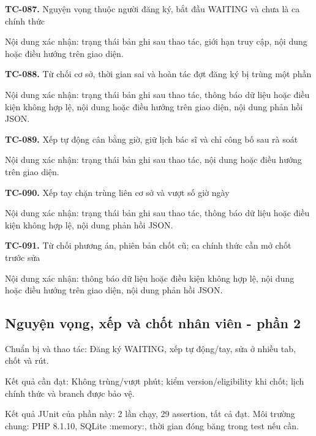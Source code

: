 \noindent\textbf{TC-087.} Nguyện vọng thuộc người đăng ký, bắt đầu WAITING và chưa là ca chính thức\par
Nội dung xác nhận:\allowbreak{} trạng thái bản ghi sau thao tác, giới hạn truy cập, nội dung hoặc điều hướng trên giao diện.\allowbreak{}

\noindent\textbf{TC-088.} Từ chối cơ sở, thời gian sai và hoàn tác đợt đăng ký bị trùng một phần\par
Nội dung xác nhận:\allowbreak{} trạng thái bản ghi sau thao tác, thông báo dữ liệu hoặc điều kiện không hợp lệ, nội dung hoặc điều hướng trên giao diện, nội dung phản hồi JSON.\allowbreak{}

\noindent\textbf{TC-089.} Xếp tự động cân bằng giờ, giữ lịch bác sĩ và chỉ công bố sau rà soát\par
Nội dung xác nhận:\allowbreak{} trạng thái bản ghi sau thao tác, nội dung hoặc điều hướng trên giao diện.\allowbreak{}

\noindent\textbf{TC-090.} Xếp tay chặn trùng liên cơ sở và vượt số giờ ngày\par
Nội dung xác nhận:\allowbreak{} trạng thái bản ghi sau thao tác, thông báo dữ liệu hoặc điều kiện không hợp lệ, nội dung phản hồi JSON.\allowbreak{}

\noindent\textbf{TC-091.} Từ chối phương án, phiên bản chốt cũ; ca chính thức cần mở chốt trước sửa\par
Nội dung xác nhận:\allowbreak{} thông báo dữ liệu hoặc điều kiện không hợp lệ, nội dung hoặc điều hướng trên giao diện, nội dung phản hồi JSON.\allowbreak{}


\par\vspace{8pt}

\subsection{Nguyện vọng, xếp và chốt nhân viên - phần 2}
Chuẩn bị và thao tác:\allowbreak{} Đăng ký WAITING, xếp tự động/\allowbreak{}tay, sửa ở nhiều tab, chốt và rút.\allowbreak{}

Kết quả cần đạt:\allowbreak{} Không trùng/\allowbreak{}vượt phút; kiểm version/\allowbreak{}eligibility khi chốt; lịch chính thức và branch được bảo vệ.\allowbreak{}

Kết quả JUnit của phần này:\allowbreak{} 2 lần chạy, 29 assertion, tất cả đạt.\allowbreak{} Môi trường chung:\allowbreak{} PHP 8.\allowbreak{}1.\allowbreak{}10, SQLite :\allowbreak{}memory:\allowbreak{}, thời gian đóng băng trong test nếu cần.\allowbreak{}

